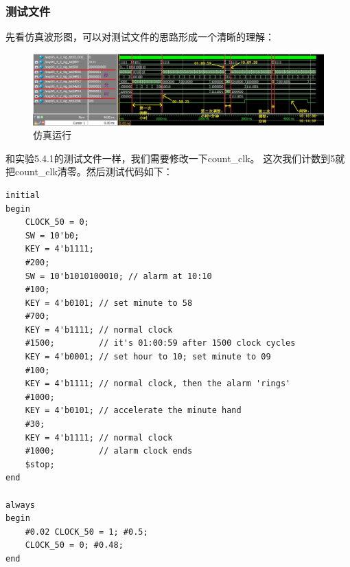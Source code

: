 \documentclass[12pt,a4paper,UTF8]{article}
\begin{document}
\subsubsection{测试文件}
先看仿真波形图，可以对测试文件的思路形成一个清晰的理解：
\begin{figure}[H]
  \centering
  \includegraphics[width=1\textwidth]{2_sim.JPG}
  \caption{仿真运行}
  \label{2_sim}
\end{figure}

和实验5.4.1的测试文件一样，我们需要修改一下count\_clk。
这次我们计数到5就把count\_clk清零。然后测试代码如下：
\begin{lstlisting}[style=verilog-style]
initial
begin
	CLOCK_50 = 0;
	SW = 10'b0;
	KEY = 4'b1111;
	#200;
	SW = 10'b1010100010; // alarm at 10:10
	#100;
	KEY = 4'b0101; // set minute to 58 
	#700;
	KEY = 4'b1111; // normal clock
	#1500;         // it's 01:00:59 after 1500 clock cycles 
	KEY = 4'b0001; // set hour to 10; set minute to 09
	#100;
	KEY = 4'b1111; // normal clock, then the alarm 'rings'
	#1000;
	KEY = 4'b0101; // accelerate the minute hand
	#30;
	KEY = 4'b1111; // normal clock
	#1000;         // alarm clock ends
	$stop;
end

always
begin
	#0.02 CLOCK_50 = 1; #0.5;
	CLOCK_50 = 0; #0.48;
end
\end{lstlisting}
\end{document}
